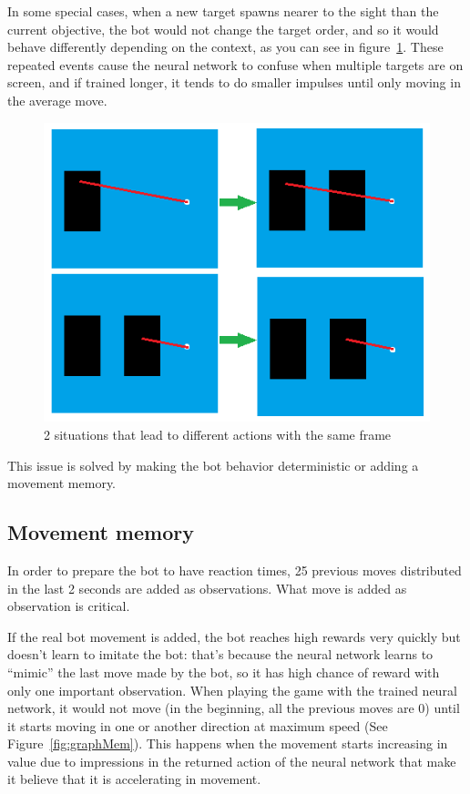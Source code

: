 In some special cases, when a new target spawns nearer to the sight than the current objective, the bot would not change the target order, and so it would behave differently depending on the context, as you can see in figure~\ref{fig:graphTR}. These repeated events cause the neural network to confuse when multiple targets are on screen, and if trained longer, it tends to do smaller impulses until only moving in the average move.

\begin{figure}[h]
  \centering
		\includegraphics[width=.9\textwidth]{img/exampleDet.png}
  \caption{2 situations that lead to different actions with the same frame}
  \label{fig:graphTR}
\end{figure}

This issue is solved by making the bot behavior deterministic or adding a movement memory.

\subsection{Movement memory}
\label{sec:movememory}

In order to prepare the bot to have reaction times, 25 previous moves distributed in the last 2 seconds are added as observations. What move is added as observation is critical.

If the real bot movement is added, the bot reaches high rewards very quickly but doesn't learn to imitate the bot: that's because the neural network learns to ``mimic'' the last move made by the bot, so it has high chance of reward with only one important observation. When playing the game with the trained neural network, it would not move (in the beginning, all the previous moves are 0) until it starts moving in one or another direction at maximum speed (See Figure~\ref{fig:graphMem}). This happens when the movement starts increasing in value due to impressions in the returned action of the neural network that make it believe that it is accelerating in movement.

